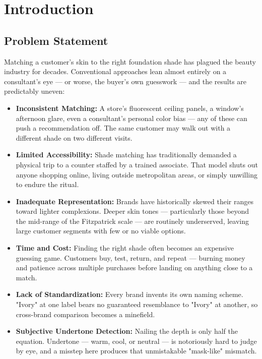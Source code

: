 \chapter{Introduction}

\section{Problem Statement}

Matching a customer's skin to the right foundation shade has plagued the beauty industry for decades. Conventional approaches lean almost entirely on a consultant's eye — or worse, the buyer's own guesswork — and the results are predictably uneven:

\begin{itemize}
    \item \textbf{Inconsistent Matching:} A store's fluorescent ceiling panels, a window's afternoon glare, even a consultant's personal color bias — any of these can push a recommendation off. The same customer may walk out with a different shade on two different visits.
    
    \item \textbf{Limited Accessibility:} Shade matching has traditionally demanded a physical trip to a counter staffed by a trained associate. That model shuts out anyone shopping online, living outside metropolitan areas, or simply unwilling to endure the ritual.
    
    \item \textbf{Inadequate Representation:} Brands have historically skewed their ranges toward lighter complexions. Deeper skin tones — particularly those beyond the mid-range of the Fitzpatrick scale — are routinely underserved, leaving large customer segments with few or no viable options.
    
    \item \textbf{Time and Cost:} Finding the right shade often becomes an expensive guessing game. Customers buy, test, return, and repeat — burning money and patience across multiple purchases before landing on anything close to a match.
    
    \item \textbf{Lack of Standardization:} Every brand invents its own naming scheme. "Ivory" at one label bears no guaranteed resemblance to "Ivory" at another, so cross-brand comparison becomes a minefield.
    
    \item \textbf{Subjective Undertone Detection:} Nailing the depth is only half the equation. Undertone — warm, cool, or neutral — is notoriously hard to judge by eye, and a misstep here produces that unmistakable "mask-like" mismatch.
\end{itemize}

